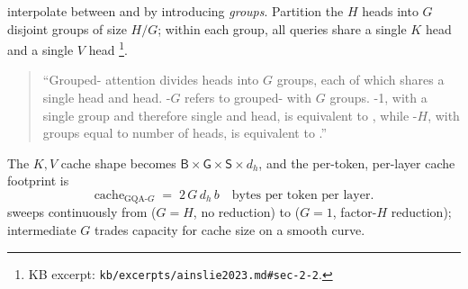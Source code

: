 \citet{ainslie2023} interpolate between  and  by introducing
\emph{groups}. Partition the $H$  heads into $G$ disjoint groups
of size $H/G$; within each group, all queries share a single $K$
head and a single $V$ head%
\footnote{KB excerpt: \nolinkurl{kb/excerpts/ainslie2023.md#sec-2-2}.}.
\begin{quote}
``Grouped- attention divides  heads into $G$ groups, each
of which shares a single  head and  head. -$G$ refers to
grouped- with $G$ groups. -1, with a single group and
therefore single  and  head, is equivalent to , while
-$H$, with groups equal to number of heads, is equivalent to .''
\citep[\S 2.2]{ainslie2023}
\end{quote}
The $K, V$ cache shape becomes
$\mathsf{B}\!\times\!\mathsf{G}\!\times\!\mathsf{S}\!\times\!d_h$, and
the per-token, per-layer cache footprint is
\begin{equation}
  \mathrm{cache}_{\mathrm{GQA\text{-}}G}
   \;=\; 2\,G\,d_h\,b
   \quad\text{bytes per token per layer}.
  \label{eq:gqa-cache}
\end{equation}
 sweeps continuously from  ($G = H$, no reduction) to 
($G = 1$, factor-$H$ reduction); intermediate $G$ trades capacity for
cache size on a smooth curve.

